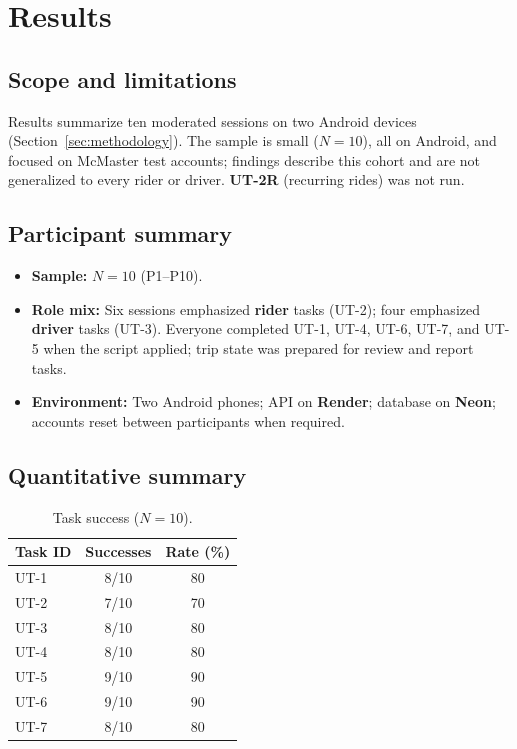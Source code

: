 \section{Results}
\label{sec:results}

\subsection{Scope and limitations}

Results summarize ten moderated sessions on two Android devices (Section~\ref{sec:methodology}). The sample is small ($N=10$), all on Android, and focused on McMaster test accounts; findings describe this cohort and are not generalized to every rider or driver. \textbf{UT-2R} (recurring rides) was not run.

\subsection{Participant summary}

\begin{itemize}
  \item \textbf{Sample:} $N=10$ (P1--P10).
  \item \textbf{Role mix:} Six sessions emphasized \textbf{rider} tasks (UT-2); four emphasized \textbf{driver} tasks (UT-3). Everyone completed UT-1, UT-4, UT-6, UT-7, and UT-5 when the script applied; trip state was prepared for review and report tasks.
  \item \textbf{Environment:} Two Android phones; API on \textbf{Render}; database on \textbf{Neon}; accounts reset between participants when required.
\end{itemize}

\subsection{Quantitative summary}

\begin{table}[htbp]
  \centering
  \caption{Task success ($N=10$).}
  \label{tab:success_rates}
  \begin{tabular}{lcc}
    \toprule
    \textbf{Task ID} & \textbf{Successes} & \textbf{Rate (\%)}\\
    \midrule
    UT-1 & 8/10 & 80\\
    UT-2 & 7/10 & 70\\
    UT-3 & 8/10 & 80\\
    UT-4 & 8/10 & 80\\
    UT-5 & 9/10 & 90\\
    UT-6 & 9/10 & 90\\
    UT-7 & 8/10 & 80\\
    \bottomrule
  \end{tabular}
\end{table}

